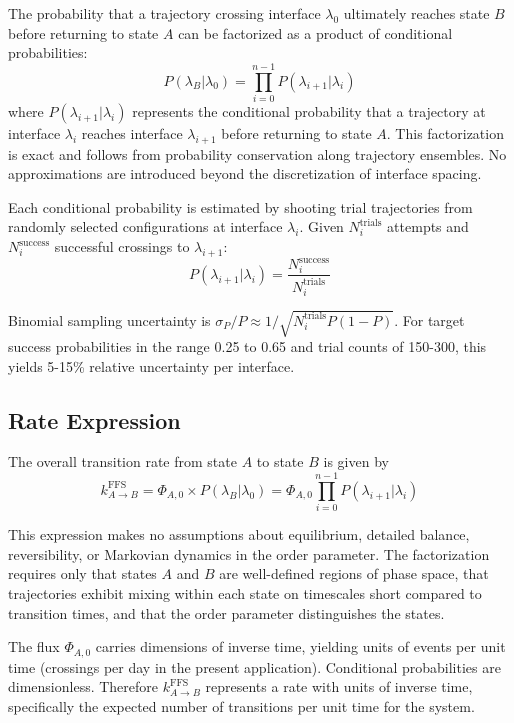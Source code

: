 \documentclass[11pt]{article}
\begin{document}
The probability that a trajectory crossing interface $\lambda_0$ ultimately reaches state $B$ before returning to state $A$ can be factorized as a product of conditional probabilities:
\begin{equation}\label{eq:ffs_factorization}
P(\lambda_B | \lambda_0) = \prod_{i=0}^{n-1} P(\lambda_{i+1} | \lambda_i)
\end{equation}
where $P(\lambda_{i+1}|\lambda_i)$ represents the conditional probability that a trajectory at interface $\lambda_i$ reaches interface $\lambda_{i+1}$ before returning to state $A$. This factorization is exact and follows from probability conservation along trajectory ensembles. No approximations are introduced beyond the discretization of interface spacing.

Each conditional probability is estimated by shooting trial trajectories from randomly selected configurations at interface $\lambda_i$. Given $N_i^{\text{trials}}$ attempts and $N_i^{\text{success}}$ successful crossings to $\lambda_{i+1}$:
\begin{equation}
P(\lambda_{i+1} | \lambda_i) = \frac{N_i^{\text{success}}}{N_i^{\text{trials}}}
\end{equation}

Binomial sampling uncertainty is $\sigma_P/P \approx 1/\sqrt{N_i^{\text{trials}} P(1-P)}$. For target success probabilities in the range 0.25 to 0.65 and trial counts of 150-300, this yields 5-15\% relative uncertainty per interface.

\subsection{Rate Expression}

The overall transition rate from state $A$ to state $B$ is given by
\begin{equation}\label{eq:ffs_rate}
k_{A \to B}^{\text{FFS}} = \Phi_{A,0} \times P(\lambda_B | \lambda_0) = \Phi_{A,0} \prod_{i=0}^{n-1} P(\lambda_{i+1} | \lambda_i)
\end{equation}

This expression makes no assumptions about equilibrium, detailed balance, reversibility, or Markovian dynamics in the order parameter. The factorization requires only that states $A$ and $B$ are well-defined regions of phase space, that trajectories exhibit mixing within each state on timescales short compared to transition times, and that the order parameter distinguishes the states.

The flux $\Phi_{A,0}$ carries dimensions of inverse time, yielding units of events per unit time (crossings per day in the present application). Conditional probabilities are dimensionless. Therefore $k_{A \to B}^{\text{FFS}}$ represents a rate with units of inverse time, specifically the expected number of transitions per unit time for the system.
\end{document}
